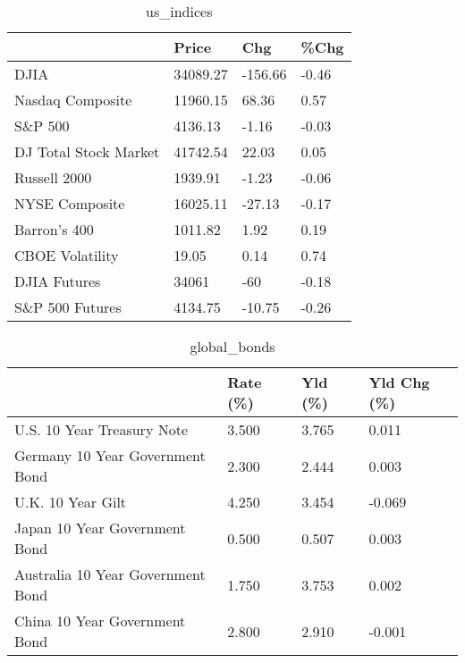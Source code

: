 \documentclass{article}%
\begin{document}
%


\begin{table}[htbp]%
\caption{us\_indices}%
\centering%
\begin{adjustbox}{width=1\textwidth}%
\begin{tabular}{llll}
\toprule
                      &    Price &     Chg &  \%Chg \\
\midrule
                 DJIA & 34089.27 & -156.66 & -0.46 \\
     Nasdaq Composite & 11960.15 &   68.36 &  0.57 \\
              S\&P 500 &  4136.13 &   -1.16 & -0.03 \\
DJ Total Stock Market & 41742.54 &   22.03 &  0.05 \\
         Russell 2000 &  1939.91 &   -1.23 & -0.06 \\
       NYSE Composite & 16025.11 &  -27.13 & -0.17 \\
         Barron's 400 &  1011.82 &    1.92 &  0.19 \\
      CBOE Volatility &    19.05 &    0.14 &  0.74 \\
         DJIA Futures &    34061 &     -60 & -0.18 \\
      S\&P 500 Futures &  4134.75 &  -10.75 & -0.26 \\
\bottomrule
\end{tabular}
%
\end{adjustbox}%
\end{table}

%


\begin{table}[htbp]%
\caption{global\_bonds}%
\centering%
\begin{adjustbox}{width=1\textwidth}%
\begin{tabular}{llll}
\toprule
                                  & Rate (\%) & Yld (\%) & Yld Chg (\%) \\
\midrule
       U.S. 10 Year Treasury Note &    3.500 &   3.765 &       0.011 \\
  Germany 10 Year Government Bond &    2.300 &   2.444 &       0.003 \\
                U.K. 10 Year Gilt &    4.250 &   3.454 &      -0.069 \\
    Japan 10 Year Government Bond &    0.500 &   0.507 &       0.003 \\
Australia 10 Year Government Bond &    1.750 &   3.753 &       0.002 \\
    China 10 Year Government Bond &    2.800 &   2.910 &      -0.001 \\
\bottomrule
\end{tabular}
%
\end{adjustbox}%
\end{table}
\end{document}

